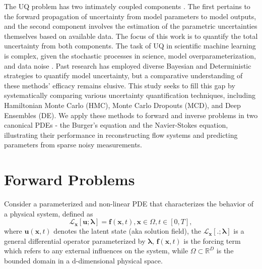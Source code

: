 \documentclass{article}
\begin{document}
The UQ problem has two intimately coupled components \citep{najm2009uncertainty}. The first pertains to the forward propagation of uncertainty from model parameters to model outputs, and the second component involves the estimation of the parametric uncertainties themselves based on available data. The focus of this work is to quantify the total uncertainty from both components. The task of UQ in scientific machine learning is complex, given the stochastic processes in science, model overparameterization, and data noise \citep[e.g.,][]{he2023survey, gal2016uncertainty, basu2022uncertainty, zou2022neuraluq}. Past research has employed diverse Bayesian and Deterministic strategies to quantify model uncertainty, but a comparative understanding of these methods’ efficacy remains elusive. This study seeks to fill this gap by systematically comparing various uncertainty quantification techniques, including Hamiltonian Monte Carlo (HMC), Monte Carlo Dropouts (MCD), and Deep Ensembles (DE).
We apply these methods to forward and inverse problems in two canonical PDEs - the Burger’s equation and the Navier-Stokes equation, illustrating their performance in reconstructing flow systems and predicting parameters from sparse noisy measurements. 


\section{Forward Problems}
Consider a parameterized and non-linear PDE that characterizes the behavior of a physical system, defined as 
\begin{equation}
\mathbf{\mathcal{L}}_{\mathbf{x}}[\mathbf{u};\mathbf{\lambda}] = \mathbf{f} (\mathbf{x},t),\mathbf{x} \in \Omega,t \in [0, T],
\end{equation}
where $\mathbf{u}(\mathbf{x},t)$ denotes the latent state (aka solution field), the $\mathbf{\mathcal{L}}_{\mathbf{x}}[.;\mathbf{\lambda}]$ is a general differential operator parameterized by $\mathbf{\lambda}$, $\mathbf{f} (\mathbf{x},t)$ is the forcing term which refers to any external influences on the system, while $\Omega \subset \mathbb{R}^{D}$ is the bounded domain in a d-dimensional physical space.
\end{document}
